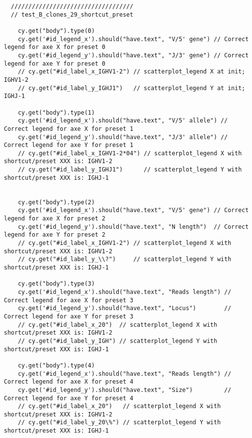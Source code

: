 \begin{verbatim}
  ///////////////////////////////////
  // test_B_clones_29_shortcut_preset

    cy.get("body").type(0)
    cy.get('#id_legend_x').should("have.text", "V/5' gene") // Correct legend for axe X for preset 0
    cy.get('#id_legend_y').should("have.text", "J/3' gene") // Correct legend for axe Y for preset 0
    // cy.get("#id_label_x_IGHV1-2") // scatterplot_legend X at init; IGHV1-2
    // cy.get("#id_label_y_IGHJ1")   // scatterplot_legend Y at init; IGHJ-1

    cy.get("body").type(1)
    cy.get('#id_legend_x').should("have.text", "V/5' allele") // Correct legend for axe X for preset 1
    cy.get('#id_legend_y').should("have.text", "J/3' allele") // Correct legend for axe Y for preset 1
    // cy.get("#id_label_x_IGHV1-2*04") // scatterplot_legend X with shortcut/preset XXX is: IGHV1-2
    // cy.get("#id_label_y_IGHJ1")      // scatterplot_legend Y with shortcut/preset XXX is: IGHJ-1


    cy.get("body").type(2)
    cy.get('#id_legend_x').should("have.text", "V/5' gene") // Correct legend for axe X for preset 2
    cy.get('#id_legend_y').should("have.text", "N length")  // Correct legend for axe Y for preset 2
    // cy.get("#id_label_x_IGHV1-2") // scatterplot_legend X with shortcut/preset XXX is: IGHV1-2
    // cy.get("#id_label_y_\\?")     // scatterplot_legend Y with shortcut/preset XXX is: IGHJ-1

    cy.get("body").type(3)
    cy.get('#id_legend_x').should("have.text", "Reads length") // Correct legend for axe X for preset 3
    cy.get('#id_legend_y').should("have.text", "Locus")        // Correct legend for axe Y for preset 3
    // cy.get("#id_label_x_20")  // scatterplot_legend X with shortcut/preset XXX is: IGHV1-2
    // cy.get("#id_label_y_IGH") // scatterplot_legend Y with shortcut/preset XXX is: IGHJ-1

    cy.get("body").type(4)
    cy.get('#id_legend_x').should("have.text", "Reads length") // Correct legend for axe X for preset 4
    cy.get('#id_legend_y').should("have.text", "Size")         // Correct legend for axe Y for preset 4
    // cy.get("#id_label_x_20")   // scatterplot_legend X with shortcut/preset XXX is: IGHV1-2
    // cy.get("#id_label_y_20\%") // scatterplot_legend Y with shortcut/preset XXX is: IGHJ-1


\end{verbatim}
